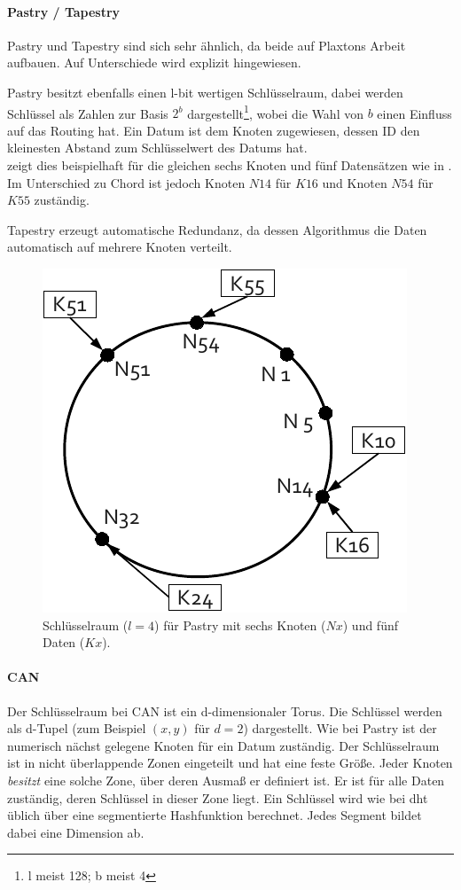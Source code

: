 \paragraph{Pastry / Tapestry}
Pastry \cite{Rowstron2001} und Tapestry \cite{Zhao2001Tapestry,Zhao2004Tapestry} sind sich sehr ähnlich, da beide auf Plaxtons Arbeit \cite{Plaxton1997Accessing} aufbauen. Auf Unterschiede wird explizit hingewiesen.

Pastry besitzt ebenfalls einen l-bit wertigen Schlüsselraum, dabei werden Schlüssel als Zahlen zur Basis $2^b$ dargestellt\footnote{l meist 128; b meist 4}, wobei die Wahl von $b$ einen Einfluss auf das Routing hat. Ein Datum ist dem Knoten zugewiesen, dessen ID den kleinesten Abstand zum Schlüsselwert des Datums hat.\\
 zeigt dies beispielhaft für die gleichen sechs Knoten und fünf Datensätzen wie in . Im Unterschied zu Chord ist jedoch Knoten $N14$ für $K16$ und Knoten $N54$ für $K55$ zuständig.

Tapestry erzeugt automatische Redundanz, da dessen Algorithmus die Daten automatisch auf mehrere Knoten verteilt.

\begin{figure}[htbp]
\centering
\includegraphics{grafics/pastry_key_space.pdf}
\caption{Schlüsselraum ($l=4$) für Pastry mit sechs Knoten ($Nx$) und fünf Daten ($Kx$).}
\label{fig:pastry_key_space}
\end{figure}


\paragraph{CAN}
Der Schlüsselraum bei CAN \cite{Ratnasamy2001Scalable} ist ein d-dimensionaler Torus. Die Schlüssel werden als d-Tupel (zum Beispiel $(x,y)$ für $d=2$) dargestellt. Wie bei Pastry ist der numerisch nächst gelegene Knoten für ein Datum zuständig. Der Schlüsselraum ist in nicht überlappende Zonen eingeteilt und hat eine feste Größe. Jeder Knoten \emph{besitzt} eine solche Zone, über deren Ausmaß er definiert ist. Er ist für alle Daten zuständig, deren Schlüssel in dieser Zone liegt. Ein Schlüssel wird wie bei \ac{dht} üblich über eine segmentierte Hashfunktion berechnet. Jedes Segment bildet dabei eine Dimension ab.

